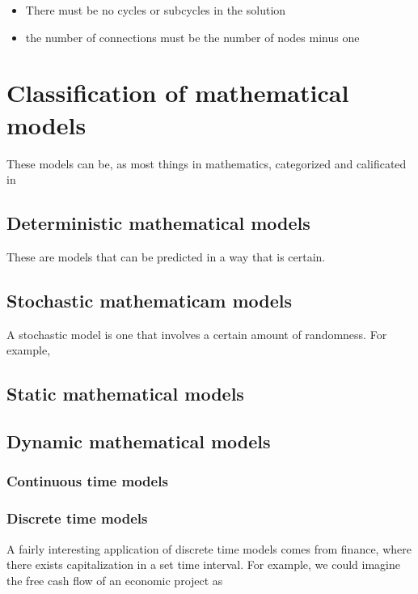 \documentclass{textbook}
\begin{document}
\begin{itemize}
    \item There must be no cycles or subcycles in the solution
    \item the number of connections must be the number of nodes minus one
\end{itemize}

\section{Classification of mathematical models}

These models can be, as most things in mathematics, categorized and calificated in 

\subsection{Deterministic mathematical models}

These are models that can be predicted in a way that is certain.

\subsection{Stochastic mathematicam models}

A stochastic model is one that involves a certain amount of randomness. For example, 

\subsection{Static mathematical models}

\subsection{Dynamic mathematical models}
\subsubsection{Continuous time models}
\subsubsection{Discrete time models}

A fairly interesting application of discrete time models comes from finance, where there exists 
capitalization in a set time interval. For example, we could imagine the free cash flow of an economic project as
\end{document}
